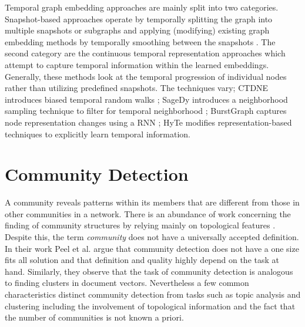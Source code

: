 Temporal graph embedding approaches are mainly split into two categories. 
Snapshot-based approaches operate by temporally splitting the graph into multiple snapshots or subgraphs and applying (modifying) existing graph embedding methods by temporally smoothing between the snapshots \cite{zhouDynamicNetworkEmbedding2019, goyalDyngraph2vecCapturingNetwork2020, mahdaviDynamicJointVariational2020, parejaEvolveGCNEvolvingGraph2020}.
The second category are the continuous temporal representation approaches which attempt to capture temporal information within the learned embeddings.
Generally, these methods look at the temporal progression of individual nodes rather than utilizing predefined snapshots.
The techniques vary; CTDNE introduces biased temporal random walks \cite{nguyenContinuousTimeDynamicNetwork2018}; SageDy introduces a neighborhood sampling technique to filter for temporal neighborhood \cite{wuSageDyNovelSampling2021}; BurstGraph captures node representation changes using a RNN \cite{zhaoLargeScaleEvolving2019}; HyTe \cite{dasguptaHyTEHyperplanebasedTemporally2018} modifies representation-based techniques to explicitly learn temporal information.


\section{Community Detection}
A community reveals patterns within its members that are different from those in other communities in a network.
There is an abundance of work concerning the finding of community structures by relying mainly on topological features \cite{fortunatoCommunityDetectionGraphs2010, xieOverlappingCommunityDetection2013}.
Despite this, the term \textit{community} does not have a universally accepted definition.
In their work Peel et al. \cite{peelGroundTruthMetadata2017} argue that community detection does not have a one size fits all solution and that definition and quality highly depend on the task at hand.
Similarly, they observe that the task of community detection is analogous to finding clusters in document vectors.
Nevertheless a few common characteristics distinct community detection from tasks such as topic analysis and clustering including the involvement of topological information and the fact that the number of communities is not known a priori.

